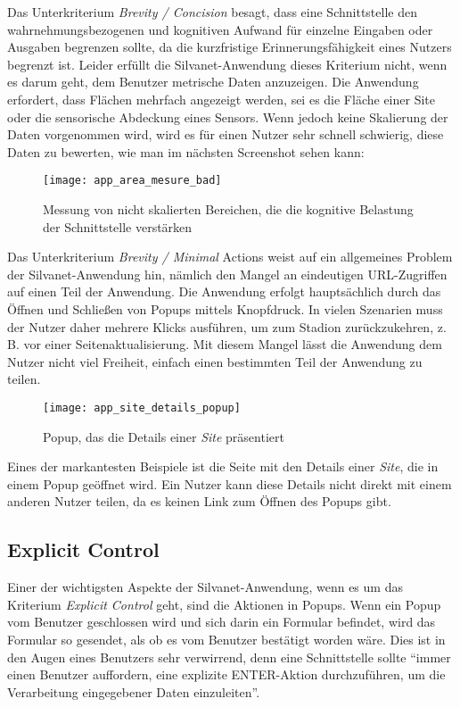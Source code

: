 Das Unterkriterium \textit{Brevity / Concision} besagt, dass eine Schnittstelle den wahrnehmungsbezogenen und kognitiven Aufwand für einzelne Eingaben oder Ausgaben begrenzen sollte, da die kurzfristige Erinnerungsfähigkeit eines Nutzers begrenzt ist.
Leider erfüllt die Silvanet-Anwendung dieses Kriterium nicht, wenn es darum geht, dem Benutzer metrische Daten anzuzeigen.
Die Anwendung erfordert, dass Flächen mehrfach angezeigt werden, sei es die Fläche einer Site oder die sensorische Abdeckung eines Sensors.
Wenn jedoch keine Skalierung der Daten vorgenommen wird, wird es für einen Nutzer sehr schnell schwierig, diese Daten zu bewerten, wie man im nächsten Screenshot sehen kann:

\begin{figure}[H]
  \centering
  \texttt{[image: app\_area\_mesure\_bad]}
  \caption{Messung von nicht skalierten Bereichen, die die kognitive Belastung der Schnittstelle verstärken}
  \label{fig:app_area_mesure_bad}
\end{figure}

Das Unterkriterium \textit{Brevity / Minimal} Actions weist auf ein allgemeines Problem der Silvanet-Anwendung hin, nämlich den Mangel an eindeutigen URL-Zugriffen auf einen Teil der Anwendung.
Die Anwendung erfolgt hauptsächlich durch das Öffnen und Schließen von Popups mittels Knopfdruck.
In vielen Szenarien muss der Nutzer daher mehrere Klicks ausführen, um zum Stadion zurückzukehren, z. B. vor einer Seitenaktualisierung.
Mit diesem Mangel lässt die Anwendung dem Nutzer nicht viel Freiheit, einfach einen bestimmten Teil der Anwendung zu teilen.

\begin{figure}[H]
  \centering
  \texttt{[image: app\_site\_details\_popup]}
  \caption{Popup, das die Details einer \textit{Site} präsentiert}
  \label{fig:app_site_details_popup}
\end{figure}

Eines der markantesten Beispiele ist die Seite mit den Details einer \textit{Site}, die in einem Popup geöffnet wird.
Ein Nutzer kann diese Details nicht direkt mit einem anderen Nutzer teilen, da es keinen Link zum Öffnen des Popups gibt.


\subsection{Explicit Control}

Einer der wichtigsten Aspekte der Silvanet-Anwendung, wenn es um das Kriterium \textit{Explicit Control} geht, sind die Aktionen in Popups.
Wenn ein Popup vom Benutzer geschlossen wird und sich darin ein Formular befindet, wird das Formular so gesendet, als ob es vom Benutzer bestätigt worden wäre.
Dies ist in den Augen eines Benutzers sehr verwirrend, denn eine Schnittstelle sollte ``immer einen Benutzer auffordern, eine explizite ENTER-Aktion durchzuführen, um die Verarbeitung eingegebener Daten einzuleiten''\cite{bastienscapin}.

